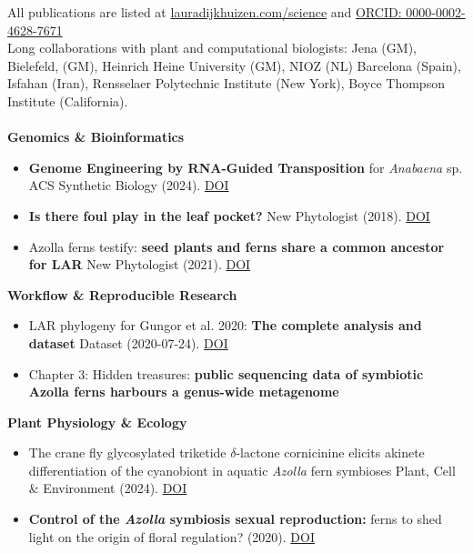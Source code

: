 \documentclass[a4paper,10pt]{article}
\begin{document}
\noindent All publications are listed at \href{https://lauradijkhuizen.com/science}{lauradijkhuizen.com/science}  and 
\textcolor[HTML]{A6CE39}{\faOrcid}\href{https://orcid.org/0000-0002-4628-7671}{ORCID: 0000-0002-4628-7671}
\\
\noindent Long collaborations with plant and computational biologists: Jena (GM), Bielefeld, (GM), Heinrich Heine University (GM), NIOZ (NL) Barcelona (Spain), Isfahan (Iran), Rensselaer Polytechnic Institute (New York), Boyce Thompson Institute (California). \\
\\
\noindent\textbf{Genomics \& Bioinformatics}
  \begin{itemize}
    \item \textbf{Genome Engineering by RNA-Guided Transposition} for \textit{Anabaena} sp.  
      ACS Synthetic Biology (2024). \href{https://doi.org/10.1021/acssynbio.3c00583}{DOI}
    \item \textbf{Is there foul play in the leaf pocket?}  
      New Phytologist (2018). \href{https://doi.org/10.1111/nph.14843}{DOI}
      \item Azolla ferns testify: \textbf{seed plants and ferns share a common ancestor for LAR}  
        New Phytologist (2021). \href{https://doi.org/10.1111/nph.16896}{DOI}
  \end{itemize}

\noindent\textbf{Workflow \& Reproducible Research}
  \begin{itemize}
    \item LAR phylogeny for Gungor et al. 2020: \textbf{The complete analysis and dataset}  
      Dataset (2020-07-24). \href{https://doi.org/10.5281/zenodo.3959057}{DOI}
    \item Chapter 3: Hidden treasures: \textbf{public sequencing data of symbiotic Azolla ferns harbours a genus-wide metagenome}
  \end{itemize}

\noindent\textbf{Plant Physiology \& Ecology}
  \begin{itemize}
    \item The crane fly glycosylated triketide $\delta$-lactone cornicinine elicits akinete differentiation of the cyanobiont in aquatic \textit{Azolla} fern symbioses  
      Plant, Cell \& Environment (2024). \href{https://doi.org/10.1111/pce.14907}{DOI}
    \item \textbf{Control of the \textit{Azolla} symbiosis sexual reproduction:} ferns to shed light on the origin of floral regulation?  
      (2020). \href{https://doi.org/10.3389/fpls.2021.693039}{DOI}
  \end{itemize}
\end{document}
